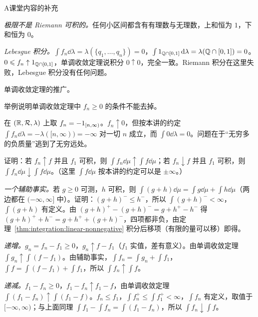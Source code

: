 \begin{exercises}{A}{课堂内容的补充}
\begin{solution}
\emph{极限不是 Riemann 可积的。}任何小区间都含有有理数与无理数，上和恒为 $1$，下和恒为 $0$。

\emph{Lebesgue 积分。}$\int f_n\dd\lambda=\lambda(\{q_1,\dots,q_n\})=0$，$\int1_{\mathbb{Q}\cap[0,1]}\,\mathrm{d}\lambda=\lambda(\mathbb{Q}\cap[0,1])=0$。$0\leqslant f_n\uparrow1_{\mathbb{Q}\cap[0,1]}$，单调收敛定理说积分 $0\uparrow0$，完全一致。Riemann 积分在这里失败，Lebesgue 积分没有任何问题。
\end{solution}

\item\label{ex:integration:A5} 单调收敛定理的推广。
\begin{questions}
\item 举例说明单调收敛定理中 $f_n\geqslant0$ 的条件不能去掉。
\begin{solution}
在 $(\mathbb{R},\mathcal{R},\lambda)$ 上取 $f_n=-1_{[n,\infty)}$。$f_n\uparrow0$，但按本讲的约定 $\int f_n\dd\lambda=-\lambda([n,\infty))=-\infty$ 对一切 $n$ 成立，而 $\int0\dd\lambda=0$。问题在于“无穷多的负质量”逃到了无穷远处。
\end{solution}
\item 证明：若 $f_n\uparrow f$ 并且 $f_1$ 可积，则 $\int f_n\dd\mu\uparrow\int f\dd\mu$；若 $f_n\downarrow f$ 并且 $f_1$ 可积，则 $\int f_n\dd\mu\downarrow\int f\dd\mu$。（这里 $\int f\dd\mu$ 按本讲的约定可以是 $\pm\infty$。）
\begin{solution}
\emph{一个辅助事实。}若 $g\geqslant0$ 可测，$h$ 可积，则 $\int(g+h)\dd\mu=\int g\dd\mu+\int h\dd\mu$（两边都在 $(-\infty,\infty]$ 中）。证明：$(g+h)^-\leqslant h^-$，所以 $\int(g+h)^-<\infty$，$\int(g+h)$ 有定义。由 $(g+h)^+-(g+h)^-=g+h^+-h^-$ 得 $(g+h)^++h^-=g+h^++(g+h)^-$，四项都非负，由定理~\ref{thm:integration:linear-nonnegative} 积分后移项（有限的量可以移）即得。

\emph{递增。}$g_n=f_n-f_1\geqslant0$，$g_n\uparrow f-f_1$（$f_1$ 实值，差有意义）。由单调收敛定理 $\int g_n\uparrow\int(f-f_1)$。由辅助事实，$\int f_n=\int g_n+\int f_1$，$\int f=\int(f-f_1)+\int f_1$，所以 $\int f_n\uparrow\int f$。

\emph{递减。}$f_1-f_n\geqslant0$，$f_1-f_n\uparrow f_1-f$，由单调收敛定理 $\int(f_1-f_n)\uparrow\int(f_1-f)$。$f_n\leqslant f_1$，$\int f_n^+\leqslant\int f_1^+<\infty$，$\int f_n$ 有定义，取值于 $[-\infty,\infty)$；与上面同理 $\int f_1-\int f_n=\int(f_1-f_n)$，所以 $\int f_n\downarrow\int f$。
\end{solution}
\end{questions}


\end{exercises}
